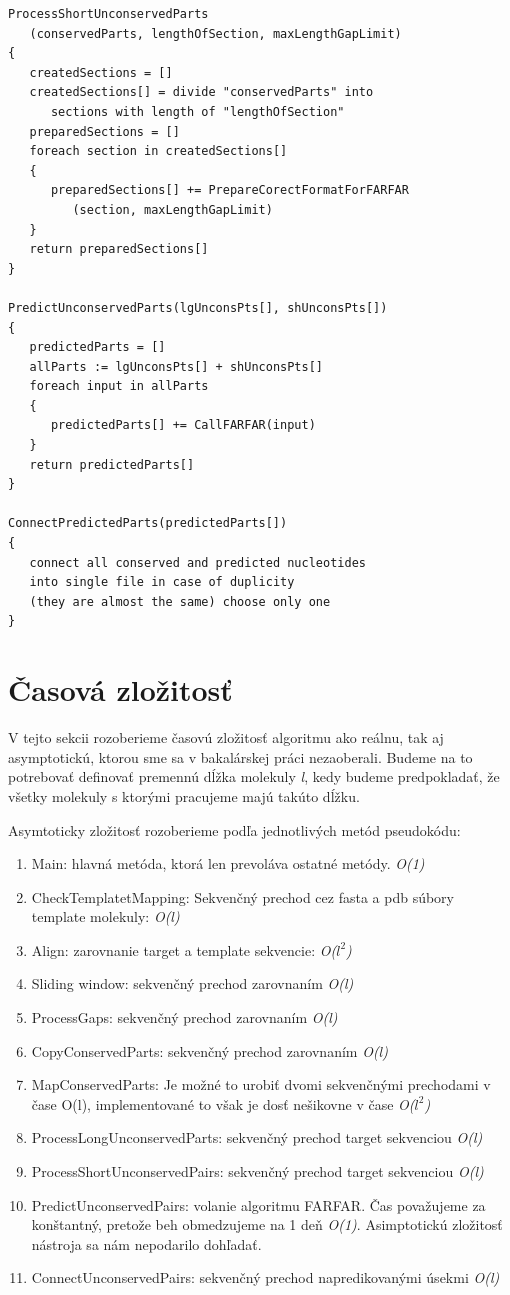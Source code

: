 \begin{lstlisting}
ProcessShortUnconservedParts
   (conservedParts, lengthOfSection, maxLengthGapLimit)
{
   createdSections = []
   createdSections[] = divide "conservedParts" into 
      sections with length of "lengthOfSection"
   preparedSections = []
   foreach section in createdSections[]
   {
      preparedSections[] += PrepareCorectFormatForFARFAR
         (section, maxLengthGapLimit)
   }
   return preparedSections[]
}

PredictUnconservedParts(lgUnconsPts[], shUnconsPts[])
{
   predictedParts = []
   allParts := lgUnconsPts[] + shUnconsPts[]
   foreach input in allParts
   {
      predictedParts[] += CallFARFAR(input)
   }
   return predictedParts[]	
}

ConnectPredictedParts(predictedParts[])
{
   connect all conserved and predicted nucleotides 
   into single file in case of duplicity
   (they are almost the same) choose only one 
}
\end{lstlisting}


\section{Časová zložitosť}
V tejto sekcii rozoberieme časovú zložitosť algoritmu ako reálnu, tak aj asymptotickú, ktorou sme sa v bakalárskej práci nezaoberali. Budeme na to potrebovať definovať premennú dĺžka molekuly \textit{l}, kedy budeme predpokladať, že všetky molekuly s ktorými pracujeme majú takúto dĺžku. 


\indent Asymtoticky zložitosť rozoberieme podľa jednotlivých metód pseudokódu:
 \begin{enumerate}
\item Main: hlavná metóda, ktorá len prevoláva ostatné metódy. \textit{O(1)}
\item CheckTemplatetMapping: Sekvenčný prechod cez fasta a pdb súbory template molekuly: \textit{O(l)}
\item Align: zarovnanie target a template sekvencie: \textit{O($l^2$)}
\item Sliding window: sekvenčný prechod zarovnaním \textit{O(l)}
\item ProcessGaps: sekvenčný prechod zarovnaním \textit{O(l)}
\item CopyConservedParts: sekvenčný prechod zarovnaním \textit{O(l)}
\item MapConservedParts: Je možné to urobiť dvomi sekvenčnými prechodami v čase O(l), implementované to však je dosť nešikovne v čase \textit{O($l^2$)} 
\item ProcessLongUnconservedParts: sekvenčný prechod target sekvenciou \textit{O(l)}
\item ProcessShortUnconservedPairs: sekvenčný prechod target sekvenciou \textit{O(l)}
\item PredictUnconservedPairs: volanie algoritmu FARFAR. Čas považujeme za konštantný, pretože beh obmedzujeme na 1 deň \textit{O(1)}. Asimptotickú zložitosť nástroja sa nám nepodarilo dohľadať. 
\item ConnectUnconservedPairs: sekvenčný prechod napredikovanými úsekmi \textit{O(l)}
 \end{enumerate}

